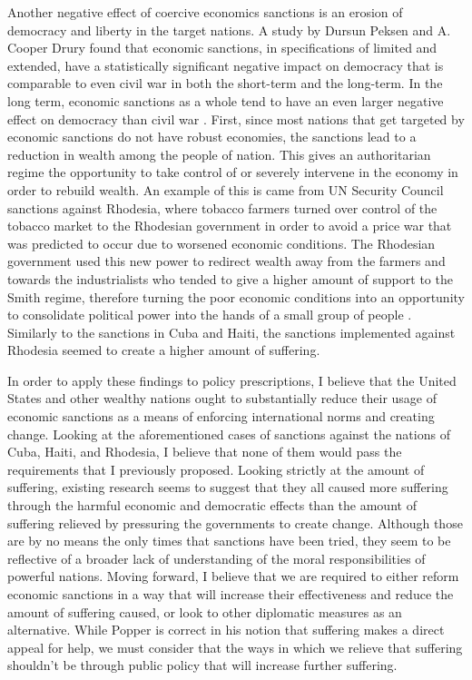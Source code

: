 \documentclass[12pt]{article}
\begin{document}
Another negative effect of coercive economics sanctions is an erosion of democracy and liberty in the target nations.
A study by Dursun Peksen and A. Cooper Drury found that economic sanctions, in specifications of limited and extended, have a statistically significant negative impact on democracy that is comparable to even civil war in both the short-term and the long-term.
In the long term, economic sanctions as a whole tend to have an even larger negative effect on democracy than civil war \autocite[255, 257]{peksen2010}.
First, since most nations that get targeted by economic sanctions do not have robust economies, the sanctions lead to a reduction in wealth among the people of nation.
This gives an authoritarian regime the opportunity to take control of or severely intervene in the economy in order to rebuild wealth.
An example of this is came from UN Security Council sanctions against Rhodesia, where tobacco farmers turned over control of the tobacco market to the Rhodesian government in order to avoid a price war that was predicted to occur due to worsened economic conditions.
The Rhodesian government used this new power to redirect wealth away from the farmers and towards the industrialists who tended to give a higher amount of support to the Smith regime, therefore turning the poor economic conditions into an opportunity to consolidate political power into the hands of a small group of people \autocite[244]{peksen2010}.
Similarly to the sanctions in Cuba and Haiti, the sanctions implemented against Rhodesia seemed to create a higher amount of suffering.

In order to apply these findings to policy prescriptions, I believe that the United States and other wealthy nations ought to substantially reduce their usage of economic sanctions as a means of enforcing international norms and creating change.
Looking at the aforementioned cases of sanctions against the nations of Cuba, Haiti, and Rhodesia, I believe that none of them would pass the requirements that I previously proposed.
Looking strictly at the amount of suffering, existing research seems to suggest that they all caused more suffering through the harmful economic and democratic effects than the amount of suffering relieved by pressuring the governments to create change.
Although those are by no means the only times that sanctions have been tried, they seem to be reflective of a broader lack of understanding of the moral responsibilities of powerful nations.
Moving forward, I believe that we are required to either reform economic sanctions in a way that will increase their effectiveness and reduce the amount of suffering caused, or look to other diplomatic measures as an alternative.
While Popper is correct in his notion that suffering makes a direct appeal for help, we must consider that the ways in which we relieve that suffering shouldn't be through public policy that will increase further suffering.

\newpage
\printbibliography{}
\end{document}
